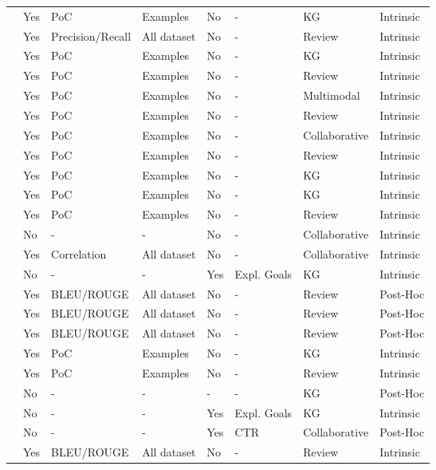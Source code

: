 \begin{xltabular}{\textwidth}{l|l|l|l|l|l|l|l}
    \cite{10.1145/3219819.3219965} & Yes & PoC & Examples & No & - & KG & Intrinsic \\
    \cite{10.1145/3178876.3186070} & Yes & Precision/Recall & All dataset & No & - & Review & Intrinsic \\
    \cite{10.1145/3308558.3313705} & Yes & PoC & Examples & No & - & KG & Intrinsic \\
    \cite{10.1145/3397271.3401137} & Yes & PoC & Examples & No & - & Review & Intrinsic \\
    \cite{10.1145/3343031.3351034} & Yes & PoC & Examples & No & - & Multimodal & Intrinsic \\
    \cite{10.1145/2806416.2806504} & Yes & PoC & Examples & No & - & Review & Intrinsic \\
    \cite{10.1145/3159652.3159668} & Yes & PoC & Examples & No & - & Collaborative & Intrinsic \\
    \cite{10.1145/3109859.3109890} & Yes & PoC & Examples & No & - & Review & Intrinsic \\
    \cite{10.1145/3331184.3331203} & Yes & PoC & Examples & No & - & KG & Intrinsic \\
    \cite{10.1145/3442381.3450133} & Yes & PoC & Examples & No & - & KG & Intrinsic \\
    \cite{10.1145/3178876.3186145} & Yes & PoC & Examples & No & - & Review & Intrinsic \\
    \cite{10.1145/3178876.3186154} & No & - & - & No & - & Collaborative & Intrinsic \\
    \cite{10.1145/3442381.3449788} & Yes & Correlation & All dataset & No & - & Collaborative & Intrinsic \\
    \cite{10.1145/3631700.3665226} & No & - & - & Yes & Expl. Goals & KG & Intrinsic \\
    \cite{10.1145/3637528.3671781} & Yes & BLEU/ROUGE & All dataset & No & - & Review & Post-Hoc \\
    \cite{10.1145/3543507.3583260} & Yes & BLEU/ROUGE & All dataset & No & - & Review & Post-Hoc \\
    \cite{10.1145/3624918.3625331} & Yes & BLEU/ROUGE & All dataset & No & - & Review & Post-Hoc \\
    \cite{10.1145/3485447.3511937} & Yes & PoC & Examples & No & - & KG & Intrinsic \\
    \cite{10.1145/3485447.3512029} & Yes & PoC & Examples & No & - & Review & Intrinsic \\
    \cite{10.1145/3604915.3609491} & No & - & - & - & - & KG & Post-Hoc \\
    \cite{10.1145/3636555.3636898} & No & - & - & Yes & Expl. Goals & KG & Intrinsic \\
    \cite{10.1145/3616855.3635855} & No & - & - & Yes & CTR & Collaborative & Post-Hoc \\
    \cite{10.1145/3539618.3591776} & Yes & BLEU/ROUGE & All dataset & No & - & Review & Intrinsic \\
    \bottomrule
    \end{xltabular}
    